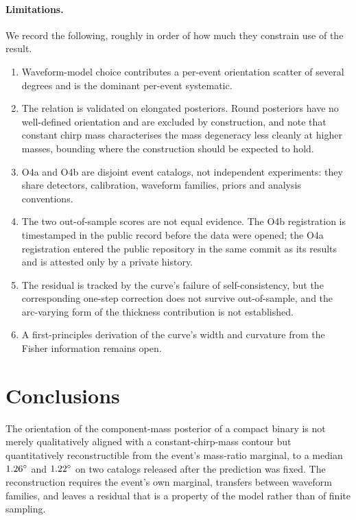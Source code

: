 \documentclass[aps,prd,twocolumn,amsmath,amssymb,nofootinbib,superscriptaddress]{revtex4-2}
\begin{document}
\paragraph{Limitations.} We record the following, roughly in order of how much they constrain use of the
result.
\begin{enumerate}\itemsep2pt \parskip0pt
\item Waveform-model choice contributes a per-event orientation scatter of several degrees and is the
dominant per-event systematic.
\item The relation is validated on elongated posteriors. Round posteriors have no well-defined orientation
and are excluded by construction, and \citet{Baird2013} note that constant chirp mass characterises the
mass degeneracy less cleanly at higher masses, bounding where the construction should be expected to hold.
\item O4a and O4b are disjoint event catalogs, not independent experiments: they share detectors,
calibration, waveform families, priors and analysis conventions.
\item The two out-of-sample scores are not equal evidence. The O4b registration is timestamped in the
public record before the data were opened; the O4a registration entered the public repository in the same
commit as its results and is attested only by a private history.
\item The residual is tracked by the curve's failure of self-consistency, but the corresponding one-step
correction does not survive out-of-sample, and the arc-varying form of the thickness contribution is not
established.
\item A first-principles derivation of the curve's width and curvature from the Fisher information remains
open.
\end{enumerate}

\section{Conclusions}
\label{sec:conclusions}
The orientation of the component-mass posterior of a compact binary is not merely qualitatively aligned
with a constant-chirp-mass contour but quantitatively reconstructible from the event's mass-ratio marginal,
to a median $1.26^\circ$ and $1.22^\circ$ on two catalogs released after the
prediction was fixed. The reconstruction requires the event's own marginal, transfers between waveform
families, and leaves a residual that is a property of the model rather than of finite sampling.
\end{document}
